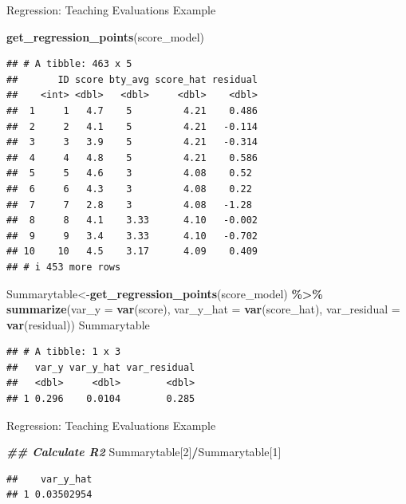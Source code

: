 \documentclass[
  ignorenonframetext,
]{beamer}
\newenvironment{Shaded}{\begin{snugshade}}{\end{snugshade}}
\newcommand{\AttributeTok}[1]{\textcolor[rgb]{0.13,0.29,0.53}{#1}}
\newcommand{\DecValTok}[1]{\textcolor[rgb]{0.00,0.00,0.81}{#1}}
\newcommand{\DocumentationTok}[1]{\textcolor[rgb]{0.56,0.35,0.01}{\textbf{\textit{#1}}}}
\newcommand{\FunctionTok}[1]{\textcolor[rgb]{0.13,0.29,0.53}{\textbf{#1}}}
\newcommand{\NormalTok}[1]{#1}
\newcommand{\OtherTok}[1]{\textcolor[rgb]{0.56,0.35,0.01}{#1}}
\newcommand{\SpecialCharTok}[1]{\textcolor[rgb]{0.81,0.36,0.00}{\textbf{#1}}}
\begin{document}
\begin{frame}[fragile]{Regression: Teaching Evaluations Example}
\protect\hypertarget{regression-teaching-evaluations-example-11}{}
\tiny

\begin{Shaded}
\begin{Highlighting}[]
\FunctionTok{get\_regression\_points}\NormalTok{(score\_model) }
\end{Highlighting}
\end{Shaded}

\begin{verbatim}
## # A tibble: 463 x 5
##       ID score bty_avg score_hat residual
##    <int> <dbl>   <dbl>     <dbl>    <dbl>
##  1     1   4.7    5         4.21    0.486
##  2     2   4.1    5         4.21   -0.114
##  3     3   3.9    5         4.21   -0.314
##  4     4   4.8    5         4.21    0.586
##  5     5   4.6    3         4.08    0.52 
##  6     6   4.3    3         4.08    0.22 
##  7     7   2.8    3         4.08   -1.28 
##  8     8   4.1    3.33      4.10   -0.002
##  9     9   3.4    3.33      4.10   -0.702
## 10    10   4.5    3.17      4.09    0.409
## # i 453 more rows
\end{verbatim}

\begin{Shaded}
\begin{Highlighting}[]
\NormalTok{Summarytable}\OtherTok{\textless{}{-}}\FunctionTok{get\_regression\_points}\NormalTok{(score\_model) }\SpecialCharTok{\%\textgreater{}\%} 
  \FunctionTok{summarize}\NormalTok{(}\AttributeTok{var\_y =} \FunctionTok{var}\NormalTok{(score), }
                      \AttributeTok{var\_y\_hat =} \FunctionTok{var}\NormalTok{(score\_hat), }
                      \AttributeTok{var\_residual =} \FunctionTok{var}\NormalTok{(residual))}
\NormalTok{Summarytable}
\end{Highlighting}
\end{Shaded}

\begin{verbatim}
## # A tibble: 1 x 3
##   var_y var_y_hat var_residual
##   <dbl>     <dbl>        <dbl>
## 1 0.296    0.0104        0.285
\end{verbatim}

\normalsize
\end{frame}

\begin{frame}[fragile]{Regression: Teaching Evaluations Example}
\protect\hypertarget{regression-teaching-evaluations-example-12}{}
\tiny

\begin{Shaded}
\begin{Highlighting}[]
\DocumentationTok{\#\# Calculate R2}
\NormalTok{Summarytable[}\DecValTok{2}\NormalTok{]}\SpecialCharTok{/}\NormalTok{Summarytable[}\DecValTok{1}\NormalTok{]}
\end{Highlighting}
\end{Shaded}

\begin{verbatim}
##    var_y_hat
## 1 0.03502954
\end{verbatim}

\normalsize
\end{frame}
\end{document}
